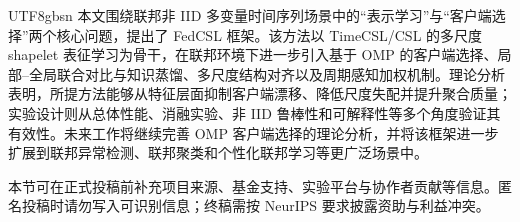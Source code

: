 \documentclass{article}
\begin{document}
\begin{CJK*}{UTF8}{gbsn}
本文围绕联邦非 IID 多变量时间序列场景中的“表示学习”与“客户端选择”两个核心问题，提出了 FedCSL 框架。该方法以 TimeCSL/CSL 的多尺度 shapelet 表征学习为骨干，在联邦环境下进一步引入基于 OMP 的客户端选择、局部--全局联合对比与知识蒸馏、多尺度结构对齐以及周期感知加权机制。理论分析表明，所提方法能够从特征层面抑制客户端漂移、降低尺度失配并提升聚合质量；实验设计则从总体性能、消融实验、非 IID 鲁棒性和可解释性等多个角度验证其有效性。未来工作将继续完善 OMP 客户端选择的理论分析，并将该框架进一步扩展到联邦异常检测、联邦聚类和个性化联邦学习等更广泛场景中。


\begin{ack}
本节可在正式投稿前补充项目来源、基金支持、实验平台与协作者贡献等信息。匿名投稿时请勿写入可识别信息；终稿需按 NeurIPS 要求披露资助与利益冲突。
\end{ack}

\end{CJK*}

{\small


}
\end{document}
